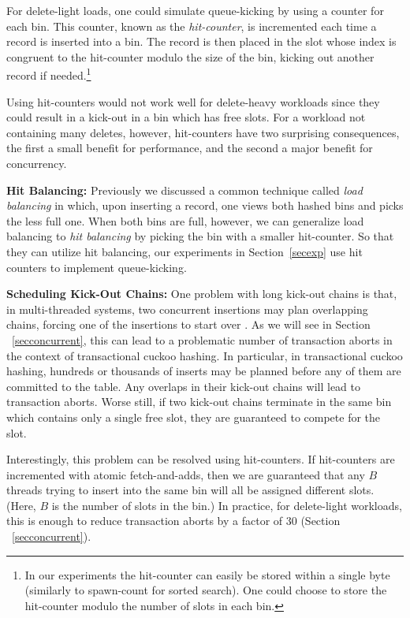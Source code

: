 \documentclass{sig-alternate-05-2015}
\begin{document}
For delete-light loads, one could simulate queue-kicking by using a
counter for each bin. This counter, known as the \emph{hit-counter},
is incremented each time a record is inserted into a bin. The record
is then placed in the slot whose index is congruent to the hit-counter
modulo the size of the bin, kicking out another record if
needed.\footnote{In our experiments the hit-counter can easily be
  stored within a single byte (similarly to spawn-count for sorted
  search). One could choose to store the hit-counter modulo the number
  of slots in each bin.}

Using hit-counters would not work well for delete-heavy workloads
since they could result in a kick-out in a bin which has free
slots. For a workload not containing many deletes, however,
hit-counters have two surprising consequences, the first a small
benefit for performance, and the second a major benefit for concurrency.

\textbf{Hit Balancing: } Previously we discussed a common technique
called \emph{load balancing} in which, upon inserting a record, one
views both hashed bins and picks the less full one. When both
bins are full, however, we can generalize load balancing to
\emph{hit balancing} by picking the bin with a smaller
hit-counter. So that they can utilize hit balancing, our experiments
in Section~\ref{secexp} use hit counters to implement queue-kicking.

\textbf{Scheduling Kick-Out Chains: } One problem with long kick-out
chains is that, in multi-threaded systems, two concurrent insertions
may plan overlapping chains, forcing one of the insertions to start
over \cite{li14}. As we will see in Section ~\ref{secconcurrent}, this
can lead to a problematic number of transaction aborts in the context of
transactional cuckoo hashing. In particular, in transactional cuckoo
hashing, hundreds or thousands of inserts may be planned before any of
them are committed to the table. Any overlaps in their kick-out chains
will lead to transaction aborts. Worse still, if two kick-out chains
terminate in the same bin which contains only a single free slot, they
are guaranteed to compete for the slot.

  Interestingly, this problem can be resolved using hit-counters. If
  hit-counters are incremented with atomic fetch-and-adds, then we are
  guaranteed that any $B$ threads trying to insert into the same bin
  will all be assigned different slots. (Here, $B$ is the number of
  slots in the bin.) In practice, for delete-light workloads, this is
  enough to reduce transaction aborts by a factor of 30 (Section
 ~\ref{secconcurrent}).
\end{document}
